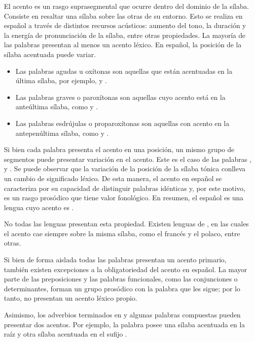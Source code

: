 El acento es un rasgo suprasegmental que ocurre dentro del dominio de la sílaba.
Consiste en resaltar una sílaba sobre las otras de su entorno. Esto se realiza
en español a través de distintos recursos acústicos: aumento del tono, la
duración y la energía de pronunciación de la sílaba, entre otras propiedades.
La mayoría de las palabras presentan al menos un acento léxico. En español, la
posición de la sílaba acentuada puede variar.

\begin{itemize}
  \item Las palabras agudas u oxítonas son aquellas que están acentuadas en la
        última sílaba, por ejemplo,  y .
  \item Las palabras graves o paroxítonas son aquellas cuyo acento está en la
        anteúltima sílaba, como  y .
  \item Las palabras esdrújulas o proparoxítonas son aquellas con acento en la
        antepenúltima sílaba, como  y .
\end{itemize}

Si bien cada palabra presenta el acento en una posición, un mismo grupo de
segmentos puede presentar variación en el acento. Este es el caso de las
palabras ,  y . Se puede observar que
la variación de la posición de la sílaba tónica conlleva un cambio de
significado léxico. De esta manera, el acento en español se caracteriza por su
capacidad de distinguir palabras idénticas y, por este motivo, es un rasgo
prosódico que tiene valor fonológico. En resumen, el español es una lengua cuyo
acento es .

No todas las lenguas presentan esta propiedad. Existen lenguas de , en las cuales el acento cae siempre sobre la misma sílaba, como el
francés y el polaco, entre otras.

Si bien de forma aislada todas las palabras presentan un acento primario,
también existen excepciones a la obligatoriedad del acento en español. La mayor
parte de las preposiciones y las palabras funcionales, como las conjunciones o
determinantes, forman un grupo prosódico con la palabra que les sigue; por lo
tanto, no presentan un acento léxico propio.

Asimismo, los adverbios terminados en  y algunas palabras
compuestas pueden presentar dos acentos. Por ejemplo, la palabra
 posee una sílaba acentuada en la raíz y otra sílaba acentuada
en el sufijo .

